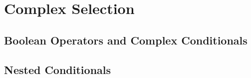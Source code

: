 
\chapter{Complex Selection}
\label{chapter:complex-selection}

\minitoc

\section{Boolean Operators and Complex Conditionals}

\section{Nested Conditionals}
